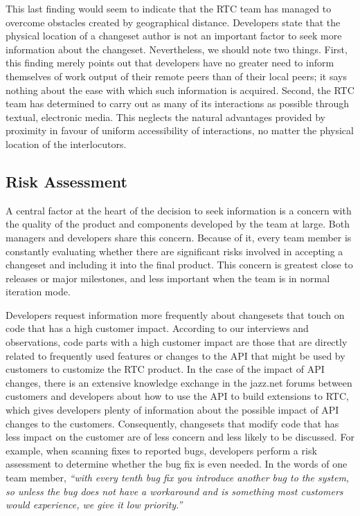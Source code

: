 \documentclass[12pt,oneside]{book}
\begin{document}
This last finding would seem to indicate that the RTC team has managed to overcome obstacles created by geographical distance. Developers state that the physical location of a changeset author is not an important factor to seek more information about the changeset. Nevertheless, we should note two things. First, this finding merely points out that developers have no greater need to inform themselves of work output of their remote peers than of their local peers; it says nothing about the ease with which such information is acquired. Second, the RTC team has determined to carry out as many of its interactions as possible through textual, electronic media. This neglects the natural advantages provided by proximity in favour of uniform accessibility of interactions, no matter the physical location of the interlocutors.
\vspace{-2pt}




\subsection{Risk Assessment}

A central factor at the heart of the decision to seek information is a concern with the quality of the product and components developed by the team at large. Both managers and developers share this concern. Because of it, every team member is constantly evaluating whether there are significant risks involved in accepting a changeset and including it into the final product. This concern is greatest close to releases or major milestones, and less important when the team is in normal iteration mode.

Developers request information more frequently about changesets that touch on code that has a high customer impact. According to our interviews and observations, code parts with a high customer impact are those that are directly related to frequently used features or changes to the API that might be used by customers to customize the RTC product. In the case of the impact of API changes, there is an extensive knowledge exchange in the jazz.net forums between customers and developers about how to use the API to build extensions to RTC, which gives developers plenty of information about the possible impact of API changes to the customers. Consequently, changesets that modify code that has less impact on the customer are of less concern and less likely to be discussed. For example, when scanning fixes to reported bugs, developers perform a risk assessment to determine whether the bug fix is even needed. In the words of one team member, \emph{``with every tenth bug fix you introduce another bug to the system, so unless the bug does not have a workaround and is something most customers would experience, we give it low priority.''}
\end{document}
